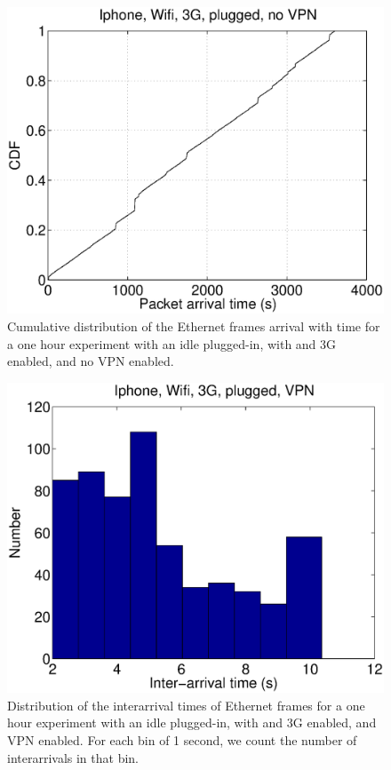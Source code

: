 \begin{figure}
\centering
        \includegraphics[width=0.8\linewidth]{../../code/pushNotification/Fig/bw_iphone_wifi_3g_plug_novpn_ts.eps}
        \caption{Cumulative distribution of the Ethernet frames
          arrival with time for a one hour experiment with an idle
          \iphone{} plugged-in, with \wifi{} and 3G enabled, and no VPN
          enabled.}
  \label{fig:push_w3p_ts}
\end{figure}

\begin{figure}
\centering
        \includegraphics[width=0.8\linewidth]{../../code/pushNotification/Fig/bw_iphone_wifi_3g_plug_vpn_interTs.eps}
  \caption{Distribution of the interarrival times of Ethernet frames
    for a one hour experiment with an idle \iphone{} plugged-in, with \wifi{} and 3G
    enabled, and VPN enabled. For each bin of 1 second, we count
    the number of interarrivals in that bin.}
  \label{fig:push_w3pv_interTs}
\end{figure}

